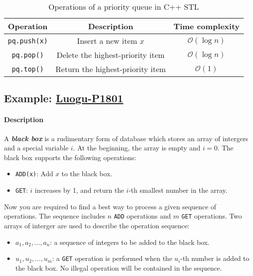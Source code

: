\documentclass[12pt,a4paper]{ctexart}
\newcommand{\highlight}[1]{\textbf{\textit{#1}}}
\begin{document}
    \begin{table}[!htbp]
        \centering
        \begin{tabular}{ccc}
            \toprule
            Operation & Description & Time complexity \\
            \midrule
            \texttt{pq.push(x)} & Insert a new item $x$ & $\mathcal O(\log n)$ \\
            \texttt{pq.pop()} & Delete the highest-priority item & $\mathcal O(\log n)$ \\
            \texttt{pq.top()} & Return the highest-priority item & $\mathcal O(1)$ \\
            \bottomrule
        \end{tabular}
        \caption{Operations of a priority queue in C++ STL}
        \label{tab:Operations of a priority queue in C++ STL}
    \end{table}

    \subsection{Example: \href{https://www.luogu.com.cn/problem/P1801}{Luogu-P1801}}

    \paragraph{Description}

    A \highlight{black box} is a rudimentary form of database which stores an array of intergers and a special variable $i$. At the beginning, the array is empty and $i=0$. The black box supports the following operations:

    \begin{itemize}
        \item \texttt{ADD(x)}: Add $x$ to the black box.
        \item \texttt{GET}: $i$ increases by 1, and return the $i$-th smallest number in the array.
    \end{itemize}

    Now you are required to find a best way to process a given sequence of operations. The sequence includes $n$ \texttt{ADD} operations and $m$ \texttt{GET} operations. Two arrays of interger are used to describe the operation sequence:

    \begin{itemize}
        \item $a_1,a_2,\dots,a_n$: a sequence of integers to be added to the black box.
        \item $u_1,u_2,\dots,u_m$: a \texttt{GET} operation is performed when the $u_i$-th number is added to the black box. No illegal operation will be contained in the sequence.
    \end{itemize}
\end{document}
